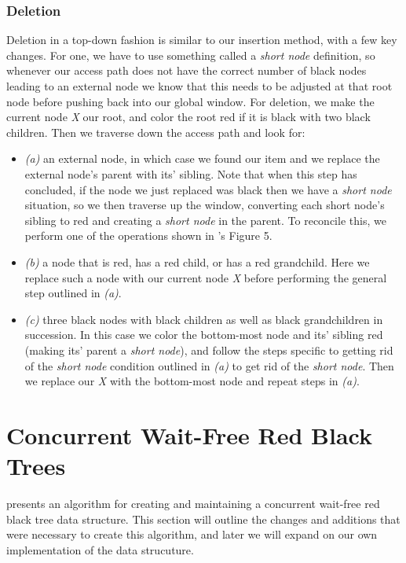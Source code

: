 \documentclass[letterpaper, 10 pt, conference]{ieeeconf}
\begin{document}
 	\subsubsection{Deletion}
 	Deletion in a top-down fashion is similar to our insertion method, with a few key changes. For one, we have to use something called a \textit{short node} definition, so whenever our access path does not have the correct number of black nodes leading to an external node we know that this needs to be adjusted at that root node before pushing back into our global window. For deletion, we make the current node \textit{X} our root, and color the root red if it is black with two black children. Then we traverse down the access path and look for:
 	\begin{itemize}
 		\item \textit{(a)} an external node, in which case we found our item and we replace the external node's parent with its' sibling. Note that when this step has concluded, if the node we just replaced was black then we have a \textit{short node} situation, so we then traverse up the window, converting each short node's sibling to red and creating a \textit{short node} in the parent. To reconcile this, we perform one of the operations shown in \cite{c7}'s Figure 5.
 		\item \textit{(b)} a node that is red, has a red child, or has a red grandchild. Here we replace such a node with our current node \textit{X} before performing the general step outlined in \textit{(a)}.
 		\item \textit{(c)} three black nodes with black children as well as black grandchildren in succession. In this case we color the bottom-most node and its' sibling red (making its' parent a \textit{short node}), and follow the steps specific to getting rid of the \textit{short node} condition outlined in \textit{(a)} to get rid of the \textit{short node}. Then we replace our \textit{X} with the bottom-most node and repeat steps in \textit{(a)}.
 	\end{itemize}
	\section{Concurrent Wait-Free Red Black Trees}
	\cite{c1} presents an algorithm for creating and maintaining a concurrent wait-free red black tree data structure. This section will outline the changes and additions that were necessary to create this algorithm, and later we will expand on our own implementation of the data strucuture.
\end{document}
